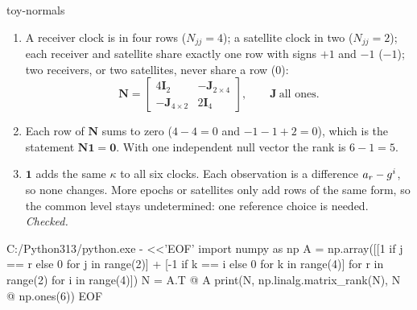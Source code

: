 \begin{answer}{toy-normals}
\solution
\begin{enumerate}[leftmargin=*, itemsep=1pt]
\item A receiver clock is in four rows ($N_{jj} = 4$); a satellite clock in two
      ($N_{jj} = 2$); each receiver and satellite share exactly one row with signs
      $+1$ and $-1$ ($-1$); two receivers, or two satellites, never share a row (0):
\[
\bm{N} = \begin{bmatrix} 4\bm{I}_2 & -\bm{J}_{2\times4} \\ -\bm{J}_{4\times2} & 2\bm{I}_4 \end{bmatrix},
\qquad \bm{J}\ \text{all ones.}
\]
\item Each row of $\bm{N}$ sums to zero ($4 - 4 = 0$ and $-1 - 1 + 2 = 0$), which is
      the statement $\bm{N}\bm{1} = \bm{0}$. With one independent null vector the rank
      is $6 - 1 = 5$.
\item $\bm{1}$ adds the same $\kappa$ to all six clocks. Each observation is a
      difference $a_r - g^i$, so none changes. More epochs or satellites only
      add rows of the same form, so the common level stays undetermined: one
      reference choice is needed. \emph{Checked.}
\end{enumerate}
\chk
\begin{cmd}
C:/Python313/python.exe - <<'EOF'
import numpy as np
A = np.array([[1 if j == r else 0 for j in range(2)]
              + [-1 if k == i else 0 for k in range(4)]
              for r in range(2) for i in range(4)])
N = A.T @ A
print(N, np.linalg.matrix_rank(N), N @ np.ones(6))
EOF
\end{cmd}
\end{answer}

